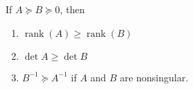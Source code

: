 \documentclass{article}
\newcommand{\inv}[1]{#1^{-1}}
\DeclareMathOperator{\rank}{rank}
\begin{document}
\begin{claim}
  If $A \succeq B \succeq 0$, then
  \begin{enumerate}
  \item $\rank(A) \ge \rank(B)$
  \item $\det A \ge \det B$
  \item $\inv{B} \succeq \inv{A}$ if $A$ and $B$ are nonsingular.
  \end{enumerate}
\end{claim}



\end{document}
